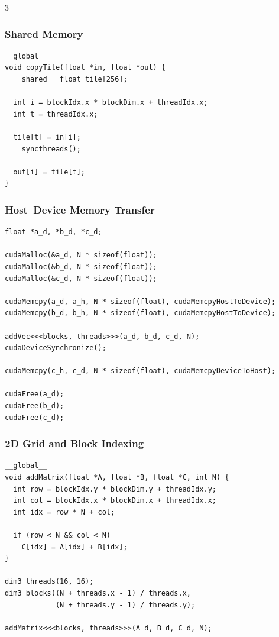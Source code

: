 \documentclass[12pt, a4paper]{article}
\begin{document}
\begin{multicols*}{3}
\subsubsection{Shared Memory}
\begin{lstlisting}[basicstyle=\ttfamily\scriptsize]
__global__
void copyTile(float *in, float *out) {
  __shared__ float tile[256];

  int i = blockIdx.x * blockDim.x + threadIdx.x;
  int t = threadIdx.x;

  tile[t] = in[i];
  __syncthreads();

  out[i] = tile[t];
}
\end{lstlisting}

\subsubsection{Host--Device Memory Transfer}
\begin{lstlisting}[basicstyle=\ttfamily\scriptsize]
float *a_d, *b_d, *c_d;

cudaMalloc(&a_d, N * sizeof(float));
cudaMalloc(&b_d, N * sizeof(float));
cudaMalloc(&c_d, N * sizeof(float));

cudaMemcpy(a_d, a_h, N * sizeof(float), cudaMemcpyHostToDevice);
cudaMemcpy(b_d, b_h, N * sizeof(float), cudaMemcpyHostToDevice);

addVec<<<blocks, threads>>>(a_d, b_d, c_d, N);
cudaDeviceSynchronize();

cudaMemcpy(c_h, c_d, N * sizeof(float), cudaMemcpyDeviceToHost);

cudaFree(a_d);
cudaFree(b_d);
cudaFree(c_d);
\end{lstlisting}

\colbreak
\subsubsection{2D Grid and Block Indexing}
\begin{lstlisting}[basicstyle=\ttfamily\scriptsize]
__global__
void addMatrix(float *A, float *B, float *C, int N) {
  int row = blockIdx.y * blockDim.y + threadIdx.y;
  int col = blockIdx.x * blockDim.x + threadIdx.x;
  int idx = row * N + col;

  if (row < N && col < N)
    C[idx] = A[idx] + B[idx];
}

dim3 threads(16, 16);
dim3 blocks((N + threads.x - 1) / threads.x,
            (N + threads.y - 1) / threads.y);

addMatrix<<<blocks, threads>>>(A_d, B_d, C_d, N);
\end{lstlisting}


\end{multicols*}
\end{document}
